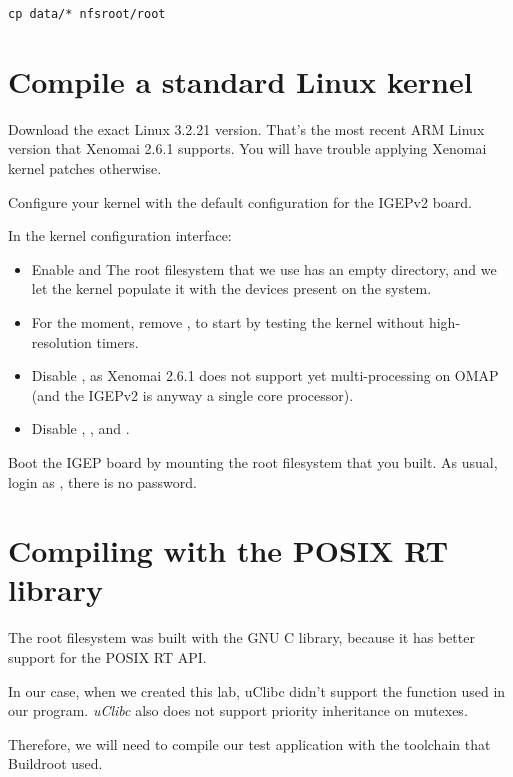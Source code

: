 \begin{verbatim}
cp data/* nfsroot/root
\end{verbatim}

\section{Compile a standard Linux kernel}

Download the exact Linux 3.2.21 version. That's the most recent
ARM Linux version that Xenomai 2.6.1 supports. You will have trouble
applying Xenomai kernel patches otherwise.

Configure your kernel with the default configuration for the IGEPv2
board.

In the kernel configuration interface:
\begin{itemize}
\item Enable  and 
      The root filesystem that we use has an empty 
      directory, and we let the kernel populate it with the devices
      present on the system.
\item For the moment, remove ,
      to start by testing the kernel without high-resolution timers.
\item Disable , as Xenomai 2.6.1 does not support
  yet multi-processing on OMAP (and the IGEPv2 is anyway a single
  core processor).
\item Disable ,
  ,  and
  .
\end{itemize}

Boot the IGEP board by mounting the root filesystem that you built.
As usual, login as , there is no password.

\section{Compiling with the POSIX RT library}

The root filesystem was built with the GNU C library, because it has
better support for the POSIX RT API.

In our case, when we created this lab, uClibc
didn't support the  function used in our
 program. {\em uClibc} also does not support priority
inheritance on mutexes.

Therefore, we will need to compile our test application with the
toolchain that Buildroot used.

